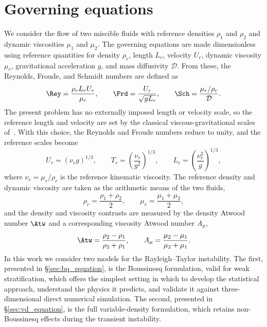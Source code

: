 \section{Governing equations}%
\label{sec:governing_equation}
We consider the flow of two miscible fluids with reference densities \(\rho_1\) and \(\rho_2\)
and dynamic viscosities \(\mu_1\) and \(\mu_2\). The governing equations are made dimensionless using reference quantities for density
\(\rho_r\), length \(L_r\), velocity \(U_r\), dynamic viscosity \(\mu_r\), gravitational
acceleration \(g\), and mass diffusivity \(\mathcal{D}\). From these, the Reynolds, Froude, and Schmidt numbers
are defined as
\begin{equation}
    \label{eq:Re_Fr_definitions}
    \Rey = \frac{\rho_r L_r U_r}{\mu_r}, \qquad \Frd = \frac{U_r}{\sqrt{g L_r}}, \qquad \Sch = \frac{\mu_r/\rho_r}{\mathcal{D}}.
\end{equation}
The present problem has no externally imposed length or velocity scale, so the reference length and velocity are set by the classical viscous-gravitational scales
of~\citet{chandrasekhar-1961}. With this choice, the Reynolds and Froude numbers reduce to unity, and the reference scales become
\begin{equation}
    \label{eq:chandrasekhar_scaling}
    U_r = (\nu_r g)^{1/3}, \qquad T_r = \left(\frac{\nu_r}{g^{2}}\right)^{1/3}, \qquad L_r = \left(\frac{\nu_r^{2}}{g}\right)^{1/3},
\end{equation}
where \(\nu_r=\mu_r/\rho_r\) is the reference kinematic viscosity. The reference density
and dynamic viscosity are taken as the arithmetic means of the two fluids,
\begin{equation}
    \label{eq:reference_quantities}
    \rho_r = \frac{\rho_1 + \rho_2}{2}, \qquad \mu_r = \frac{\mu_1 + \mu_2}{2},
\end{equation}
and the density and viscosity contrasts are measured by the density Atwood number \(\Atw\) and a corresponding viscosity Atwood number \(A_{\mu}\),
\begin{equation}
    \label{eq:atwood_numbers}
    \Atw = \frac{\rho_2 - \rho_1}{\rho_2 + \rho_1}, \qquad A_{\mu} = \frac{\mu_2 - \mu_1}{\mu_2 + \mu_1}.
\end{equation}
In this work we consider two models for the Rayleigh--Taylor instability. The first, presented in \S\ref{sec:bq_equation}, is the Boussinesq formulation, valid for weak stratification, which offers the simplest setting in which to develop the statistical approach, understand the physics it predicts, and validate it against three-dimensional direct numerical simulation. The second, presented in \S\ref{sec:vd_equation}, is the full variable-density formulation, which retains non-Boussinesq effects during the transient instability.

